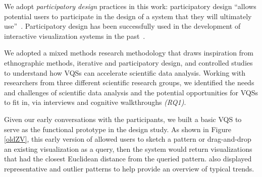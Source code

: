 \par We adopt {\em participatory design} practices in this work: participatory design ``allows potential users to 
 participate in the design of a system that they will ultimately use''~\cite{Gould1983,Muller1993}. Participatory design has been successfully used in the development of interactive visualization systems in the past~\cite{Aragon2008,Chuang2012}.  %
\par We adopted a mixed methods research methodology that draws inspiration from ethnographic methods, iterative and participatory design, and controlled studies~\cite{miller_salkind_miller_2002,shneiderman2006strategies,Muller1993} to understand how VQSs can accelerate scientific data analysis.  Working with researchers from three different scientific research groups, we identified the needs and challenges of scientific data analysis and the potential opportunities for VQSs to fit in, via interviews and cognitive walkthroughs {\em (RQ1)}. %
\par Given our early conversations with the participants, we built a basic VQS to serve as the functional prototype in the design study. As shown in Figure \ref{oldZV}, this early version of \zv allowed users to sketch a pattern or drag-and-drop an existing visualization as a query, then the system would return visualizations that had the closest Euclidean distance from the queried pattern. \zv also displayed representative and outlier patterns to help provide an overview of typical trends. 
